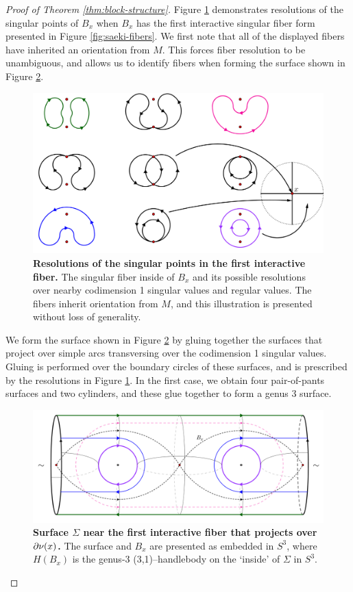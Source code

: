 \begin{proof}[Proof of Theorem \ref{thm:block-structure}]
	Figure \ref{fig:codim-2-interactive-fiber-1} demonstrates resolutions of the singular points of $B_x$ when $B_x$ has the first interactive singular fiber form presented in Figure \ref{fig:saeki-fibers}.
	We first note that all of the displayed fibers have inherited an orientation from $M$.
	This forces fiber resolution to be unambiguous, and allows us to identify fibers when forming the surface shown in Figure \ref{fig:codim-2-surface-1}.
	\begin{figure}[h!]
		\centering
		\includegraphics[width=\textwidth]{figures/codim-2-interactive-fiber-1.png}
		\caption{
			\textbf{Resolutions of the singular points in the first interactive fiber.}
			The singular fiber inside of $B_x$ and its possible resolutions over nearby codimension 1 singular values and regular values.
			The fibers inherit orientation from $M$, and this illustration is presented without loss of generality.
		}
		\label{fig:codim-2-interactive-fiber-1}
	\end{figure}
	We form the surface shown in Figure \ref{fig:codim-2-surface-1} by gluing together the surfaces that project over simple arcs transversing over the codimension 1 singular values.
	Gluing is performed over the boundary circles of these surfaces, and is prescribed by the resolutions in Figure \ref{fig:codim-2-interactive-fiber-1}.
	In the first case, we obtain four pair-of-pants surfaces and two cylinders, and these glue together to form a genus 3 surface.
	
	\begin{figure}[h!]
		\centering
		\includegraphics[width=\textwidth]{figures/codim-2-surface-1.png}
		\caption{
			\textbf{Surface $\Sigma$ near the first interactive fiber that projects over $\partial\nu(x)$.}
			The surface and $B_x$ are presented as embedded in $S^3$, where $H(B_x)$ is the genus-3 (3,1)--handlebody on the `inside' of $\Sigma$ in $S^3$.
		}
		\label{fig:codim-2-surface-1}
	\end{figure}
	

\end{proof}
